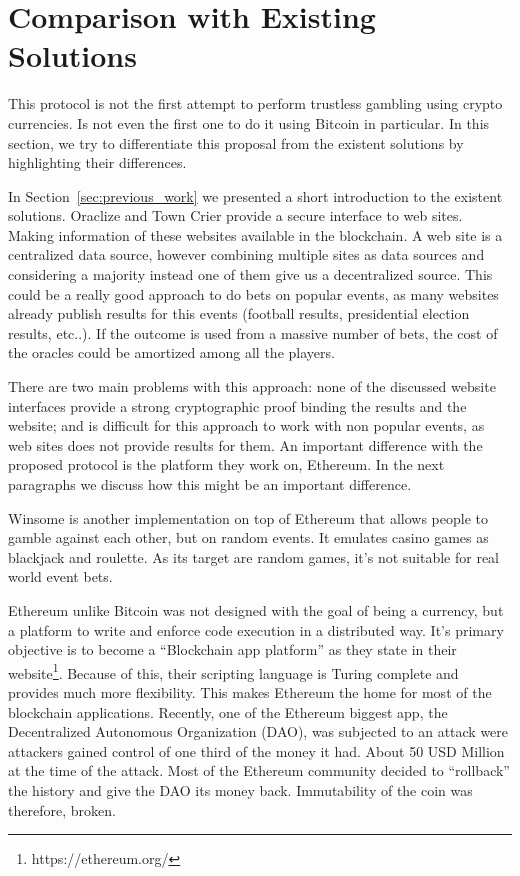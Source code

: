 \section{Comparison with Existing Solutions} \label{sec:discussion_previous_work}

This protocol is not the first attempt to perform trustless gambling using
  crypto currencies.
Is not even the first one to do it using Bitcoin in particular.
In this section, we try to differentiate this proposal from the existent
  solutions by highlighting their differences.

In Section~\ref{sec:previous_work} we presented a short introduction to the
  existent solutions.
Oraclize and Town Crier provide a secure interface to web sites.
Making information of these websites available in the blockchain.
A web site is a centralized data source, however combining multiple sites as
  data sources and considering a majority instead one of them give us a
  decentralized source.
This could be a really good approach to do bets on popular events, as
  many websites already publish results for this events (football results,
  presidential election results, etc..).
If the outcome is used from a massive number of bets, the cost of the oracles
  could be amortized among all the players.

There are two main problems with this approach: none of the discussed
  website interfaces provide a strong cryptographic proof binding the results
  and the website; and is difficult for this approach to work with non popular
  events, as web sites does not provide results for them.
An important difference with the proposed protocol is the platform they work
  on, Ethereum.
In the next paragraphs we discuss how this might be an important difference.

Winsome is another implementation on top of Ethereum that allows people to
  gamble against each other, but on random events.
It emulates casino games as blackjack and roulette.
As its target are random games, it's not suitable for real world event bets.

Ethereum unlike Bitcoin was not designed with the goal of being a currency,
  but a platform to write and enforce code execution in a distributed
  way.
It's primary objective is to become a ``Blockchain app platform'' as they
  state in their website\footnote{https://ethereum.org/}.
Because of this, their scripting language is Turing complete and provides much
  more flexibility.
This makes Ethereum the home for most of the blockchain applications.
Recently, one of the Ethereum biggest app, the Decentralized Autonomous
  Organization (DAO), was subjected to an attack were attackers gained control
  of one third of the money it had.
About 50 USD Million at the time of the attack.
Most of the Ethereum community decided to ``rollback'' the history and give the
  DAO its money back.
Immutability of the coin was therefore, broken.

